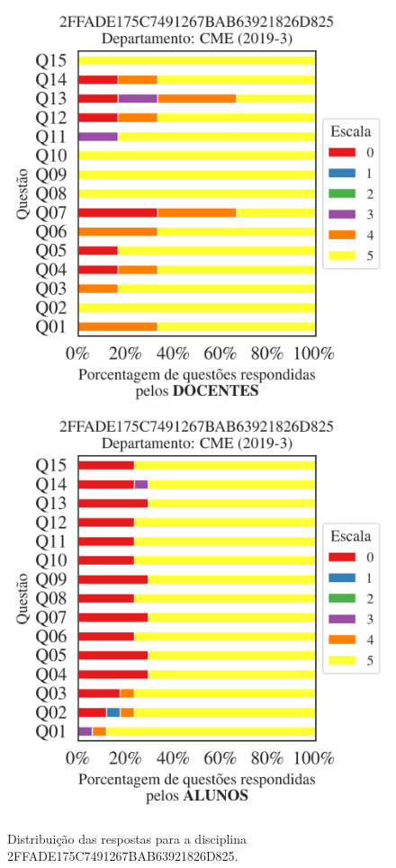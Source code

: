 \documentclass[a4paper,10pt]{article}
\begin{document}
\begin{figure}[h]
\centering
\includegraphics[width=0.485\linewidth]{analise_disciplina_departamento_CME_2FFADE175C7491267BAB63921826D825_docentes.png}
\includegraphics[width=0.485\linewidth]{analise_disciplina_departamento_CME_2FFADE175C7491267BAB63921826D825_alunos.png}
\caption{\label{fig:analise_geral_departamento}                Distribuição das respostas para a disciplina 2FFADE175C7491267BAB63921826D825. }
\end{figure}
\end{document}
